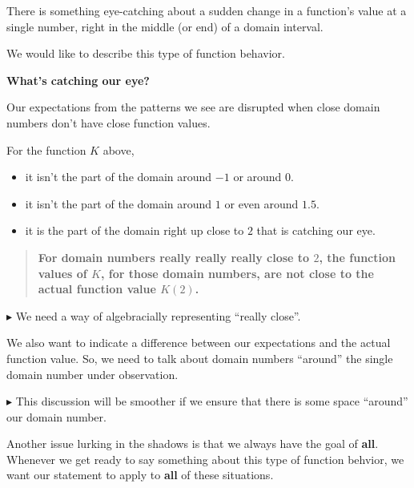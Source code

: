 \documentclass{ximera}
\begin{document}
There is something eye-catching about a sudden change in a function's value at a single number, right in the middle (or end) of a domain interval.

We would like to describe this type of function behavior. 



\begin{idea}  \textbf{\textcolor{blue!55!black}{What's catching our eye?}}


Our expectations from the patterns we see are disrupted when close domain numbers don't have close function values.


\end{idea}


For the function $K$ above, 

\begin{itemize}
\item it isn't the part of the domain around $-1$ or around $0$.  
\item it isn't the part of the domain around $1$ or even around $1.5$. 
\item it is the part of the domain right up close to $2$ that is catching our eye.
\end{itemize}


\begin{quote}
 \textbf{\textcolor{blue!55!black}{For domain numbers really really really close to $2$, the function values of $K$, for those domain numbers, are not close to the actual function value $K(2)$.}} 
 
\end{quote}







\textbf{\textcolor{red!70!darkgray}{$\blacktriangleright$}} We need a way of algebracially representing ``really close''.  


We also want to indicate a difference between our expectations and the actual function value. So, we need to talk about domain numbers ``around'' the single domain number under observation. 


\textbf{\textcolor{red!70!darkgray}{$\blacktriangleright$}} This discussion will be smoother if we ensure that there is some space ``around'' our domain number. 





Another issue lurking in the shadows is that we always have the goal of \textbf{\textcolor{red!70!black}{all}}. Whenever we get ready to say something about this type of function behvior, we want our statement to apply to \textbf{\textcolor{red!70!black}{all}} of these situations. 
\end{document}
